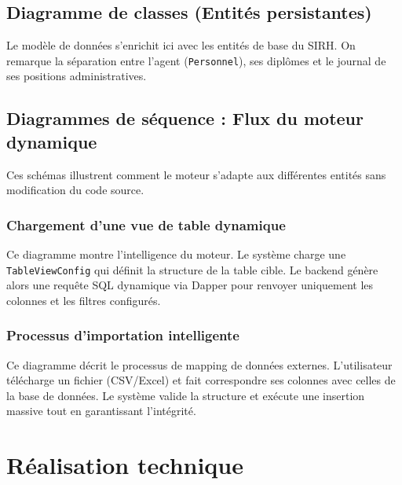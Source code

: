 \subsection{Diagramme de classes (Entités persistantes)}

Le modèle de données s'enrichit ici avec les entités de base du SIRH. On remarque la séparation entre l'agent (\texttt{Personnel}), ses diplômes et le journal de ses positions administratives.


\subsection{Diagrammes de séquence : Flux du moteur dynamique}

Ces schémas illustrent comment le moteur s'adapte aux différentes entités sans modification du code source.

\subsubsection{Chargement d'une vue de table dynamique}

Ce diagramme montre l'intelligence du moteur. Le système charge une \texttt{TableViewConfig} qui définit la structure de la table cible. Le backend génère alors une requête SQL dynamique via Dapper pour renvoyer uniquement les colonnes et les filtres configurés.


\subsubsection{Processus d'importation intelligente}

Ce diagramme décrit le processus de mapping de données externes. L'utilisateur télécharge un fichier (CSV/Excel) et fait correspondre ses colonnes avec celles de la base de données. Le système valide la structure et exécute une insertion massive tout en garantissant l'intégrité.


\section{Réalisation technique}

